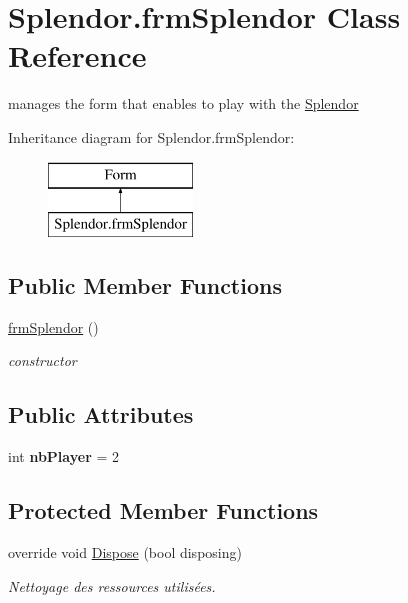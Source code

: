 \hypertarget{class_splendor_1_1frm_splendor}{}\section{Splendor.\+frm\+Splendor Class Reference}
\label{class_splendor_1_1frm_splendor}


manages the form that enables to play with the \mbox{\hyperlink{namespace_splendor}{Splendor}}  


Inheritance diagram for Splendor.\+frm\+Splendor\+:\begin{figure}[H]
\begin{center}
\leavevmode
\includegraphics[height=2.000000cm]{class_splendor_1_1frm_splendor}
\end{center}
\end{figure}
\subsection*{Public Member Functions}
\begin{DoxyCompactItemize}
\item 
\mbox{\hyperlink{class_splendor_1_1frm_splendor_ad9c938893d23192acb1996053e3ea87b}{frm\+Splendor}} ()
\begin{DoxyCompactList}\small\item\em constructor \end{DoxyCompactList}\end{DoxyCompactItemize}
\subsection*{Public Attributes}
\begin{DoxyCompactItemize}
\item 
\mbox{\label{class_splendor_1_1frm_splendor_a2d8f5bc8e919f7f6c8bfeacc6360f3af}} 
int {\bfseries nb\+Player} = 2
\end{DoxyCompactItemize}
\subsection*{Protected Member Functions}
\begin{DoxyCompactItemize}
\item 
override void \mbox{\hyperlink{class_splendor_1_1frm_splendor_a749f4f1d67c78e74aa1a55aa6fdd754b}{Dispose}} (bool disposing)
\begin{DoxyCompactList}\small\item\em Nettoyage des ressources utilisées. \end{DoxyCompactList}\end{DoxyCompactItemize}


